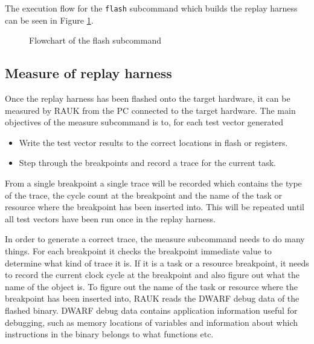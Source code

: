 The execution flow for the \texttt{flash} subcommand which builds the replay
harness can be seen in Figure \ref{fig:flashcmd}.
\begin{figure}[H]
    \centering
    \caption{Flowchart of the flash subcommand}
    \label{fig:flashcmd}
\end{figure}

\subsection{Measure of replay harness}
Once the replay harness has been flashed onto the target hardware, it can
be measured by RAUK from the PC connected to the target hardware. The main
objectives of the measure subcommand is to, for each test vector generated
\begin{itemize}
   \item Write the test vector results to the correct locations in flash or registers.
   \item Step through the breakpoints and record a trace for the current task.
\end{itemize}
From a single breakpoint a single trace will be recorded which contains the
type of the trace, the cycle count at the breakpoint and the name of the task
or resource where the breakpoint has been inserted into. This will be repeated
until all test vectors have been run once in the replay harness.

In order to generate a correct trace, the measure subcommand needs to do many
things. For each breakpoint it checks the breakpoint immediate value to
determine what kind of trace it is. If it is a task or a resource breakpoint, it
needs to record the current clock cycle at the breakpoint and also figure out
what the name of the object is. To figure out the name of the task or resource
where the breakpoint has been inserted into, RAUK reads the
DWARF\cite{dwarfspec} debug data of the flashed binary. DWARF debug data
contains application information useful for debugging, such as memory
locations of variables and information about which instructions in the binary
belongs to what functions etc.

